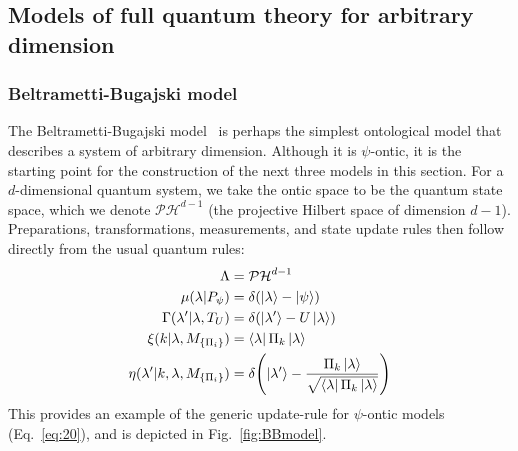 \documentclass[%
 reprint, onecolumn, 12pt,
superscriptaddress,
nofootinbib,
 prx, 
]{quantumarticle}
\begin{document}
\subsection{Models of full quantum theory for arbitrary dimension}

\subsubsection{Beltrametti-Bugajski model}
\label{sec:beltr-bugajski-model}
The Beltrametti-Bugajski
model~\cite{Beltrametticlassicalextensionquantum1995,Leiferquantumstatereal2014}
is perhaps the simplest ontological model that describes a system of
arbitrary dimension. Although it is $\psi$-ontic, it is the starting
point for the construction of the next three models in this
section. For a $d$-dimensional quantum system, we take the ontic space
to be the quantum state space, which we denote $\mathcal{PH}^{d-1}$
(the projective Hilbert space of dimension $d-1$). Preparations,
transformations, measurements, and state update rules then follow
directly from the usual quantum rules:
\begin{align}
  \Lambda
  &= \mathcal{PH}^{d-1}\nonumber\\
  \mu(\lambda|P_\psi)
  &=\delta(\ket\lambda-\ket\psi)\nonumber\\
  \Gamma(\lambda'|\lambda,T_U)
  &= \delta(\ket{\lambda'}-U\ket\lambda)\nonumber\\
  \xi(k|\lambda,M_{\{\Pi_i\}})
  &= \bra\lambda \Pi_k\ket\lambda\nonumber\\
  \eta(\lambda'|k,\lambda,M_{\{\Pi_i\}})
  &= \delta\qty(\ket{\lambda'}-\frac{\Pi_k\ket\lambda}
    {\sqrt{\bra\lambda \Pi_k\ket\lambda}})
\end{align}
This provides an example of the generic update-rule for $\psi$-ontic
models (Eq.~\ref{eq:20}), and is depicted in Fig.~\ref{fig:BBmodel}.
\end{document}
